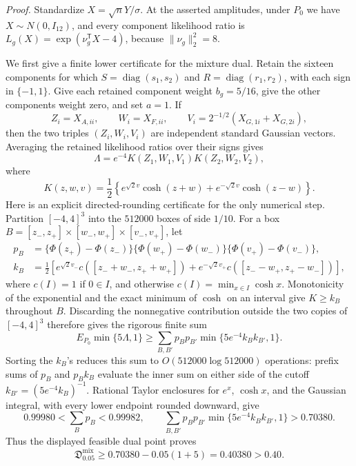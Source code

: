 \textit{Proof.}
Standardize \(X=\sqrt nY/\sigma\).  At the asserted amplitudes, under \(P_0\)
we have \(X\sim N(0,I_{12})\), and every component likelihood ratio is
\(L_g(X)=\exp(\nu_g^{\mathsf T}X-4)\), because
\(\lVert\nu_g\rVert_2^2=8\).

We first give a finite lower certificate for the mixture dual.  Retain the
sixteen components for which
\(S=\operatorname{diag}(s_1,s_2)\) and
\(R=\operatorname{diag}(r_1,r_2)\), with each sign in \(\{-1,1\}\).  Give
each retained component weight \(b_g=5/16\), give the other components weight
zero, and set \(a=1\).  If
\[
Z_i=X_{A,ii},\qquad W_i=X_{F,ii},\qquad
V_i=2^{-1/2}(X_{G,1i}+X_{G,2i}),
\]
then the two triples \((Z_i,W_i,V_i)\) are independent standard Gaussian
vectors.  Averaging the retained likelihood ratios over their signs gives
\[
\Lambda=e^{-4}K(Z_1,W_1,V_1)K(Z_2,W_2,V_2),
\]
where
\[
K(z,w,v)=\frac12\left\{e^{\sqrt2v}\cosh(z+w)
+e^{-\sqrt2v}\cosh(z-w)\right\}.
\]
Here is an explicit directed-rounding certificate for the only numerical
step.  Partition \([-4,4]^3\) into the \(512000\) boxes of side \(1/10\).
For a box
\(B=[z_-,z_+]\times[w_-,w_+]\times[v_-,v_+]\), let
\[
\begin{split}
p_B&=\{\Phi(z_+)-\Phi(z_-)\}
     \{\Phi(w_+)-\Phi(w_-)\}
     \{\Phi(v_+)-\Phi(v_-)\},\\
k_B&=\frac12\left[e^{\sqrt2v_-}c([z_-+w_-,z_++w_+])
+e^{-\sqrt2v_+}c([z_--w_+,z_+-w_-])\right],
\end{split}
\]
where \(c(I)=1\) if \(0\in I\), and otherwise
\(c(I)=\min_{x\in I}\cosh x\).  Monotonicity of the exponential and the exact
minimum of \(\cosh\) on an interval give \(K\geq k_B\) throughout \(B\).
Discarding the nonnegative contribution outside the two copies of
\([-4,4]^3\) therefore gives the rigorous finite sum
\[
E_{P_0}\min\{5\Lambda,1\}
\geq \sum_{B,B'}p_Bp_{B'}
\min\{5e^{-4}k_Bk_{B'},1\}.
\]
Sorting the \(k_B\)'s reduces this sum to \(O(512000\log 512000)\) operations:
prefix sums of \(p_B\) and \(p_Bk_B\) evaluate the inner sum on either side of
the cutoff \(k_{B'}=(5e^{-4}k_B)^{-1}\).  Rational Taylor enclosures for
\(e^x\), \(\cosh x\), and the Gaussian integral, with every lower endpoint
rounded downward, give
\[
0.99980<\sum_Bp_B<0.99982,
\qquad
\sum_{B,B'}p_Bp_{B'}\min\{5e^{-4}k_Bk_{B'},1\}>0.70380.
\]
Thus the displayed feasible dual point proves
\[
\mathfrak D_{0.05}^{\mathrm{mix}}
\geq0.70380-0.05(1+5)=0.40380>0.40.
\]

